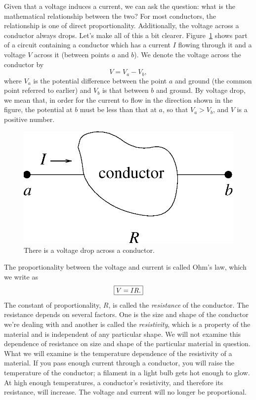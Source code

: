 Given that a voltage induces a current, we can ask the question: what is the 
mathematical relationship between the two?  For most conductors, the 
relationship is one of direct proportionality.  Additionally, the voltage 
across a conductor always drops. Let's make all of this a bit clearer. 
Figure~\ref{fig:DC:voltdrop} shows part of a circuit containing a conductor 
which has a current $I$ flowing through it and a voltage $V$ across it 
(between points $a$ and $b$).  
We denote the voltage across the conductor by 
$$ V = V_a - V_b, $$
where $V_a$ is the potential difference between the point $a$ and ground (the 
common point referred to earlier) and $V_b$ is that between $b$ and ground.
By voltage drop, we mean that, in order for the current to flow in the
direction shown in the figure, the potential at $b$ must be less than that at
$a$, so that $V_a>V_b$, and $V$ is a positive number.
\begin{figure}[!htb]
\centering \epsfxsize=5cm \includegraphics[scale=0.5]{2_dc/voltdrop.eps}
\caption{There is a voltage drop across a conductor.}
\label{fig:DC:voltdrop}
\end{figure}

The proportionality between the voltage and current is called Ohm's law, 
which we write as 
$$ \fbox{$ \displaystyle V=IR. $} $$
The constant of proportionality, $R$, is called the {\it resistance} of the 
conductor. The resistance depends on several factors. One is the size and 
shape of the conductor we're dealing with and another is called the 
{\it resistivity}, which is a property of the material and is independent of 
any particular shape. We will not examine this dependence of resistance on 
size and shape of the particular material in question. What we will examine is 
the temperature dependence of the resistivity of a material. If you pass enough
current through a conductor, you will raise the temperature of the conductor; 
a filament in a light bulb gets hot enough to glow.  At high enough 
temperatures, a conductor's resistivity, and therefore its resistance, will 
increase.  The voltage and current will no longer be proportional.  

